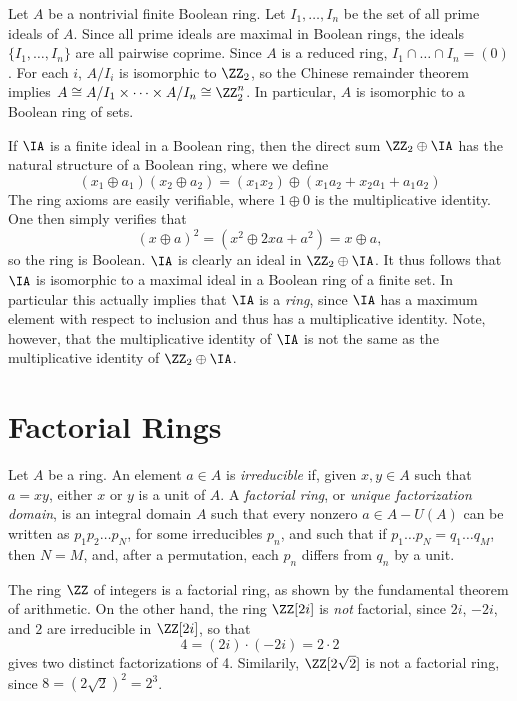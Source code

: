 \begin{example}
    Let $A$ be a nontrivial finite Boolean ring. Let $I_1, \dots, I_n$ be the set of all prime ideals of $A$. Since all prime ideals are maximal in Boolean rings, the ideals $\{ I_1, \dots, I_n \}$ are all pairwise coprime. Since $A$ is a reduced ring, $I_1 \cap \dots \cap I_n = (0)$. For each $i$, $A/I_i$ is isomorphic to $\ZZ_2$, so the Chinese remainder theorem implies $A \cong A/I_1 \times \dots \times A/I_n \cong \ZZ_2^n$. In particular, $A$ is isomorphic to a Boolean ring of sets.

    If $\IA$ is a finite ideal in a Boolean ring, then the direct sum $\ZZ_2 \oplus \IA$ has the natural structure of a Boolean ring, where we define
    \[ (x_1 \oplus a_1)(x_2 \oplus a_2) = (x_1x_2) \oplus (x_1a_2 + x_2a_1 + a_1a_2) \]
    The ring axioms are easily verifiable, where $1 \oplus 0$ is the multiplicative identity. One then simply verifies that
    \[ (x \oplus a)^2 = (x^2 \oplus 2xa + a^2) = x \oplus a, \]
    so the ring is Boolean. $\IA$ is clearly an ideal in $\ZZ_2 \oplus \IA$. It thus follows that $\IA$ is isomorphic to a maximal ideal in a Boolean ring of a finite set. In particular this actually implies that $\IA$ is a \emph{ring}, since $\IA$ has a maximum element with respect to inclusion and thus has a multiplicative identity. Note, however, that the multiplicative identity of $\IA$ is not the same as the multiplicative identity of $\ZZ_2 \oplus \IA$.
\end{example}

\section{Factorial Rings}

Let $A$ be a ring. An element $a \in A$ is \emph{irreducible} if, given $x,y \in A$ such that $a = xy$, either $x$ or $y$ is a unit of $A$. A \emph{factorial ring}, or \emph{unique factorization domain}, is an integral domain $A$ such that every nonzero $a \in A - U(A)$ can be written as $p_1 p_2 \dots p_N$, for some irreducibles $p_n$, and such that if $p_1 \dots p_N = q_1 \dots q_M$, then $N = M$, and, after a permutation, each $p_n$ differs from $q_n$ by a unit.

\begin{example}
    The ring $\ZZ$ of integers is a factorial ring, as shown by the fundamental theorem of arithmetic. On the other hand, the ring $\ZZ[2i]$ is \emph{not} factorial, since $2i$, $-2i$, and $2$ are irreducible in $\ZZ[2i]$, so that
    \[ 4 = (2i) \cdot (-2i) = 2 \cdot 2 \]
    gives two distinct factorizations of 4. Similarily, $\ZZ[2\sqrt{2}]$ is not a factorial ring, since $8 = (2\sqrt{2})^2 = 2^3$.
\end{example}

